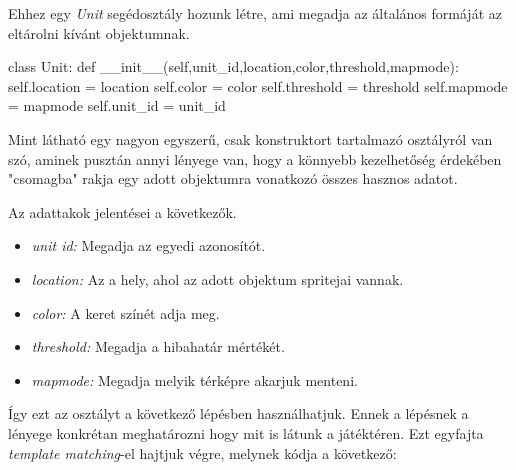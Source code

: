 Ehhez egy \textit{Unit} segédosztály hozunk létre, ami megadja az általános formáját az eltárolni kívánt objektumnak.

\begin{python}

class Unit:
    def __init__(self,unit_id,location,color,threshold,mapmode):
        self.location = location
        self.color = color
        self.threshold = threshold
        self.mapmode = mapmode
        self.unit_id = unit_id
\end{python}

Mint látható egy nagyon egyszerű, csak konstruktort tartalmazó osztályról van szó, aminek pusztán annyi lényege van, hogy a könnyebb kezelhetőség érdekében "csomagba" rakja egy adott objektumra vonatkozó összes hasznos adatot.

Az adattakok jelentései a következők.
\begin{itemize}
    \item \textit{unit id:} Megadja az egyedi azonosítót.
    \item \textit{location:} Az a hely, ahol az adott objektum spritejai vannak.
    \item \textit{color:} A keret színét adja meg.
    \item \textit{threshold:} Megadja a hibahatár mértékét. 
    \item \textit{mapmode:} Megadja melyik térképre akarjuk menteni.
\end{itemize}
Így ezt az osztályt a következő lépésben használhatjuk. Ennek a lépésnek a lényege konkrétan meghatározni hogy mit is látunk a játéktéren. Ezt egyfajta \textit{template matching}-el hajtjuk végre, melynek kódja a következő:
